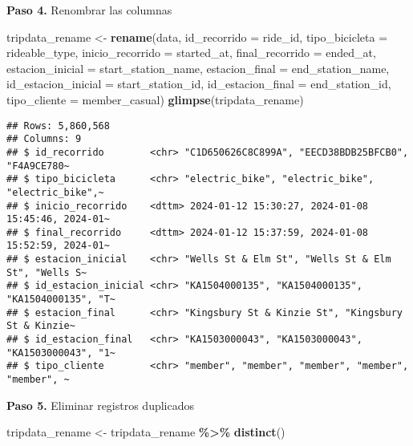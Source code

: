 \documentclass[
]{article}
\newenvironment{Shaded}{\begin{snugshade}}{\end{snugshade}}
\newcommand{\AttributeTok}[1]{\textcolor[rgb]{0.13,0.29,0.53}{#1}}
\newcommand{\FunctionTok}[1]{\textcolor[rgb]{0.13,0.29,0.53}{\textbf{#1}}}
\newcommand{\NormalTok}[1]{#1}
\newcommand{\OtherTok}[1]{\textcolor[rgb]{0.56,0.35,0.01}{#1}}
\newcommand{\SpecialCharTok}[1]{\textcolor[rgb]{0.81,0.36,0.00}{\textbf{#1}}}
\begin{document}
\hfill\break
\textbf{Paso 4.} Renombrar las columnas

\begin{Shaded}
\begin{Highlighting}[]
\NormalTok{tripdata\_rename }\OtherTok{\textless{}{-}} \FunctionTok{rename}\NormalTok{(data, }
                          \AttributeTok{id\_recorrido =}\NormalTok{ ride\_id,}
                          \AttributeTok{tipo\_bicicleta =}\NormalTok{ rideable\_type,}
                          \AttributeTok{inicio\_recorrido =}\NormalTok{ started\_at,}
                          \AttributeTok{final\_recorrido =}\NormalTok{ ended\_at,}
                          \AttributeTok{estacion\_inicial =}\NormalTok{ start\_station\_name,}
                          \AttributeTok{estacion\_final =}\NormalTok{ end\_station\_name,}
                          \AttributeTok{id\_estacion\_inicial =}\NormalTok{ start\_station\_id,}
                          \AttributeTok{id\_estacion\_final =}\NormalTok{ end\_station\_id,}
                          \AttributeTok{tipo\_cliente =}\NormalTok{ member\_casual)}
\FunctionTok{glimpse}\NormalTok{(tripdata\_rename)}
\end{Highlighting}
\end{Shaded}

\begin{verbatim}
## Rows: 5,860,568
## Columns: 9
## $ id_recorrido        <chr> "C1D650626C8C899A", "EECD38BDB25BFCB0", "F4A9CE780~
## $ tipo_bicicleta      <chr> "electric_bike", "electric_bike", "electric_bike",~
## $ inicio_recorrido    <dttm> 2024-01-12 15:30:27, 2024-01-08 15:45:46, 2024-01~
## $ final_recorrido     <dttm> 2024-01-12 15:37:59, 2024-01-08 15:52:59, 2024-01~
## $ estacion_inicial    <chr> "Wells St & Elm St", "Wells St & Elm St", "Wells S~
## $ id_estacion_inicial <chr> "KA1504000135", "KA1504000135", "KA1504000135", "T~
## $ estacion_final      <chr> "Kingsbury St & Kinzie St", "Kingsbury St & Kinzie~
## $ id_estacion_final   <chr> "KA1503000043", "KA1503000043", "KA1503000043", "1~
## $ tipo_cliente        <chr> "member", "member", "member", "member", "member", ~
\end{verbatim}

\hfill\break
\textbf{Paso 5.} Eliminar registros duplicados

\begin{Shaded}
\begin{Highlighting}[]
\NormalTok{tripdata\_rename }\OtherTok{\textless{}{-}}\NormalTok{ tripdata\_rename }\SpecialCharTok{\%\textgreater{}\%}  \FunctionTok{distinct}\NormalTok{() }
\end{Highlighting}
\end{Shaded}
\end{document}
